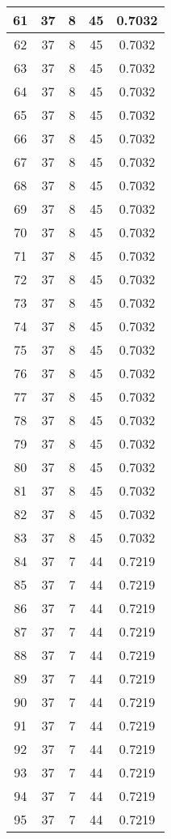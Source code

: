 \documentclass[letterpaper, 12pt]{article}
\begin{document}
\begin{longtable}{|c|c|c|c|c|}
61 & 37 & 8 & 45 & 0.7032 \\
\hline
62 & 37 & 8 & 45 & 0.7032 \\
\hline
63 & 37 & 8 & 45 & 0.7032 \\
\hline
64 & 37 & 8 & 45 & 0.7032 \\
\hline
65 & 37 & 8 & 45 & 0.7032 \\
\hline
66 & 37 & 8 & 45 & 0.7032 \\
\hline
67 & 37 & 8 & 45 & 0.7032 \\
\hline
68 & 37 & 8 & 45 & 0.7032 \\
\hline
69 & 37 & 8 & 45 & 0.7032 \\
\hline
70 & 37 & 8 & 45 & 0.7032 \\
\hline
71 & 37 & 8 & 45 & 0.7032 \\
\hline
72 & 37 & 8 & 45 & 0.7032 \\
\hline
73 & 37 & 8 & 45 & 0.7032 \\
\hline
74 & 37 & 8 & 45 & 0.7032 \\
\hline
75 & 37 & 8 & 45 & 0.7032 \\
\hline
76 & 37 & 8 & 45 & 0.7032 \\
\hline
77 & 37 & 8 & 45 & 0.7032 \\
\hline
78 & 37 & 8 & 45 & 0.7032 \\
\hline
79 & 37 & 8 & 45 & 0.7032 \\
\hline
80 & 37 & 8 & 45 & 0.7032 \\
\hline
81 & 37 & 8 & 45 & 0.7032 \\
\hline
82 & 37 & 8 & 45 & 0.7032 \\
\hline
83 & 37 & 8 & 45 & 0.7032 \\
\hline
84 & 37 & 7 & 44 & 0.7219 \\
\hline
85 & 37 & 7 & 44 & 0.7219 \\
\hline
86 & 37 & 7 & 44 & 0.7219 \\
\hline
87 & 37 & 7 & 44 & 0.7219 \\
\hline
88 & 37 & 7 & 44 & 0.7219 \\
\hline
89 & 37 & 7 & 44 & 0.7219 \\
\hline
90 & 37 & 7 & 44 & 0.7219 \\
\hline
91 & 37 & 7 & 44 & 0.7219 \\
\hline
92 & 37 & 7 & 44 & 0.7219 \\
\hline
93 & 37 & 7 & 44 & 0.7219 \\
\hline
94 & 37 & 7 & 44 & 0.7219 \\
\hline
95 & 37 & 7 & 44 & 0.7219 \\

\end{longtable}
\end{document}
